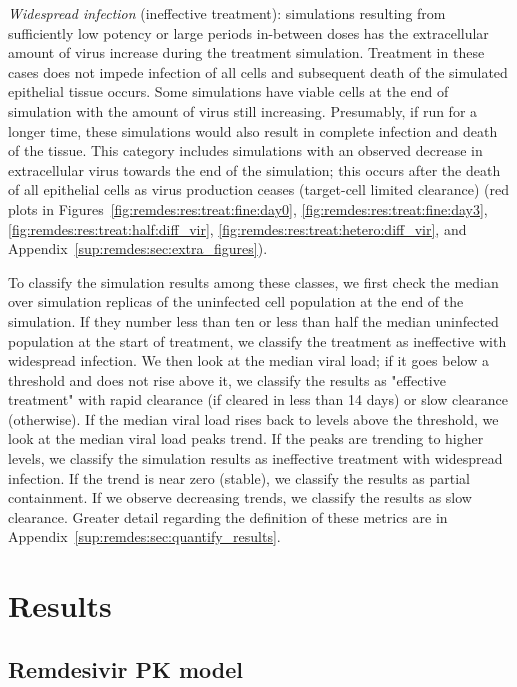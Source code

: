 \emph{Widespread infection} (ineffective treatment): simulations resulting from sufficiently low potency or large periods in-between doses has the extracellular amount of virus increase during the treatment simulation. Treatment in these cases does not impede infection of all cells and subsequent death of the simulated epithelial tissue occurs. Some simulations have viable cells at the end of simulation with the amount of virus still increasing. Presumably, if run for a longer time, these simulations would also result in complete infection and death of the tissue. This category includes simulations with an observed decrease in extracellular virus towards the end of the simulation; this occurs after the death of all epithelial cells as virus production ceases (target-cell limited clearance) (red plots in Figures~\ref{fig:remdes:res:treat:fine:day0}, \ref{fig:remdes:res:treat:fine:day3}, \ref{fig:remdes:res:treat:half:diff_vir}, \ref{fig:remdes:res:treat:hetero:diff_vir}, and Appendix~\ref{sup:remdes:sec:extra_figures}).

To classify the simulation results among these classes, we first check the median over simulation replicas of the uninfected cell population at the end of the simulation. If they number less than ten or less than half the median uninfected population at the start of treatment, we classify the treatment as ineffective with widespread infection. We then look at the median viral load; if it goes below a threshold and does not rise above it, we classify the results as "effective treatment" with rapid clearance (if cleared in less than 14 days) or slow clearance (otherwise). If the median viral load rises back to levels above the threshold, we look at the median viral load peaks trend. If the peaks are trending to higher levels, we classify the simulation results as ineffective treatment with widespread infection. If the trend is near zero (stable), we classify the results as partial containment. If we observe decreasing trends, we classify the results as slow clearance. Greater detail regarding the definition of these metrics are in Appendix~\ref{sup:remdes:sec:quantify_results}. 


\section{Results}\label{sec:remdes:res}

\subsection{Remdesivir PK model}\label{sec:remdes:res:pk}

